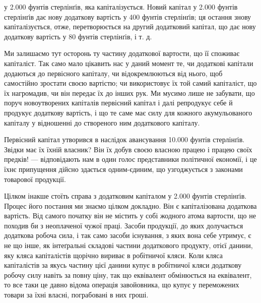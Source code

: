 \parcont{}  %
у 2.000 фунтів стерлінґів, яка капіталізується. Новий капітал у
2.000 фунтів стерлінґів дає нову додаткову вартість у 400 фунтів
стерлінґів; ця остання знову капіталізується, отже, перетворюється
на другий додатковий капітал, що дає нову додаткову
вартість у 80 фунтів стерлінґів, і т. д.

Ми залишаємо тут осторонь ту частину додаткової вартости,
що її споживає капіталіст. Так само мало цікавить нас у даний
момент те, чи додаткові капітали додаються до первісного капіталу,
чи відокремлюються від нього, щоб самостійно зростати
своєю вартістю; чи використовує їх той самий капіталіст, що
їх нагромадив, чи він передає їх до інших рук. Ми мусимо лише
не забувати, що поруч новоутворених капіталів первісний капітал
і далі репродукує себе й продукує додаткову вартість, і що
те саме має силу для кожного акумульованого капіталу у відношенні
до створеного ним додаткового капіталу.

Первісний капітал утворився в наслідок авансування 10.000
фунтів стерлінґів. Звідки має їх їхній власник? Він їх добув
своєю власною працею і працею своїх предків! — відповідають
нам в один голос представники політичної економії, і це їхнє
припущення дійсно здається одним-єдиним, що узгоджується
з законами товарової продукції.

Цілком інакше стоїть справа з додатковим капіталом у 2.000
фунтів стерлінґів. Процес його постання ми знаємо цілком докладно.
Він є капіталізована додаткова вартість. Від самого початку
він не містить у собі жодного атома вартости, що не походив
би з неоплаченої чужої праці. Засоби продукції, до яких долучається
додаткова робоча сила, і так само засоби існування,
з яких вона себе утримує, є не що інше, як інтеґральні складові
частини додаткового продукту, отієї данини, яку кляса капіталістів
щорічно вириває в робітничої кляси. Коли кляса капіталістів
за якусь частину цієї данини купує в робітничої кляси
додаткову робочу силу навіть за повну ціну, так що еквівалент
обмінюється на еквівалент, то все таки це давно відома операція
завойовника, що купує у переможених товари за їхні власні,
пограбовані в них гроші.

